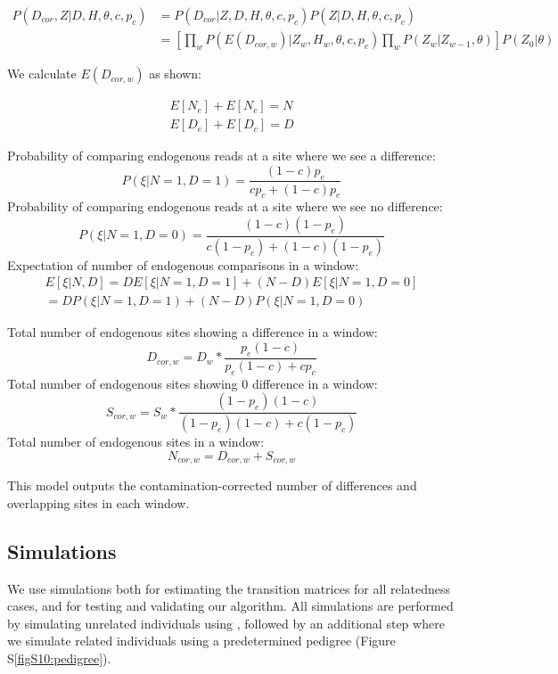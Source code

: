 \documentclass[12pt, letterpaper]{article}
\begin{document}
\begin{align}
    P(D_{cor},Z|D,H,\theta,c,p_c) &= P(D_{cor}|Z,D,H,\theta,c,p_c) P(Z|D,H,\theta,c,p_c)\nonumber\\
    &= [\prod_{w} P(E(D_{cor,w})|Z_w, H_w, \theta,c,p_c) \prod_{w} P(Z_w|Z_{w-1}, \theta)] P(Z_0| \theta)
\end{align}

We calculate $E(D_{cor,w})$ as shown:

\begin{align}
    E[N_e] + E[N_c] = N\\
    E[D_e] + E[D_c] = D
\end{align}

Probability of comparing endogenous reads at a site where we see a difference:
$$P(\xi | N = 1,D = 1)=\frac{(1-c) p_e}{c p_c + (1-c) p_e} $$
Probability of comparing endogenous reads at a site where we see no difference:
$$P(\xi | N = 1,D = 0)=\frac{(1-c)(1-p_e)}{c (1-p_c) + (1-c) (1-p_e)} $$
Expectation of number of endogenous comparisons in a window:
\begin{align}
    E[\xi | N, D] = D E[\xi | N=1, D=1] + (N-D) E[\xi | N=1, D=0]\\
    = D P(\xi | N=1, D=1) + (N-D) P(\xi | N=1, D=0)
\end{align}



Total number of endogenous sites showing a difference in a window: 
$$D_{cor,w} = D_w* \frac{p_e(1-c)}{p_e(1-c) + c p_c} $$
Total number of endogenous sites showing 0 difference in a window: 
$$S_{cor,w} = S_w* \frac{(1-p_e)(1-c)}{(1-p_e)(1-c) + c (1-p_c)} $$
Total number of endogenous sites in a window:
$$N_{cor,w} = D_{cor,w} + S_{cor,w}$$

This model outputs the contamination-corrected number of differences and overlapping sites in each window.

\subsection{Simulations}

We use simulations both for estimating the transition matrices for all relatedness cases, and for testing and validating our algorithm. All simulations are performed by simulating unrelated individuals using  \cite{kelleher_efficient_2016}, followed by an additional step where we simulate related individuals using a predetermined pedigree (Figure S\ref{figS10:pedigree}).
\end{document}

